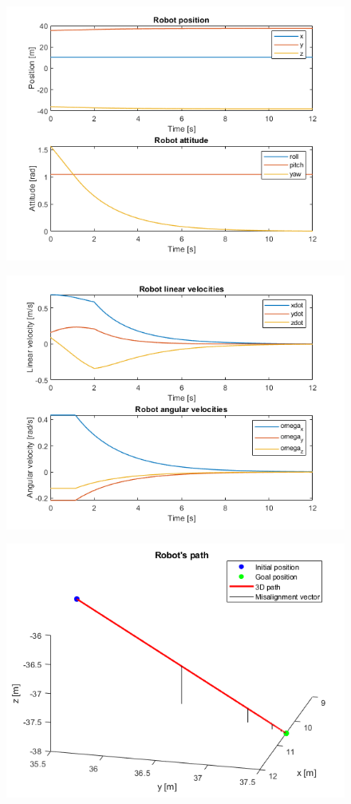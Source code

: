 \documentclass{article}
\begin{document}
\begin{figure}[H]
	\centering
	\includegraphics[width=0.7\linewidth]{images/Ex1/HorAtt_LowPrio_DifferentStartpos_DifferentEndpos_PosAndAtt}
	\caption{}
	\label{fig:q3case3a}
\end{figure}
\begin{figure}[H]
	\centering
	\includegraphics[width=0.7\linewidth]{images/Ex1/HorAtt_LowPrio_DifferentStartpos_DifferentEndpos_LinAngVelocities}
	\caption{}
	\label{fig:q3case3b}
\end{figure}
\begin{figure}[H]
	\centering
	\includegraphics[width=0.7\linewidth]{images/Ex1/HorAtt_LowPrio_DifferentStartpos_DifferentEndpos_Path}
	\caption{}
	\label{fig:q3case3c}
\end{figure}
\end{document}
